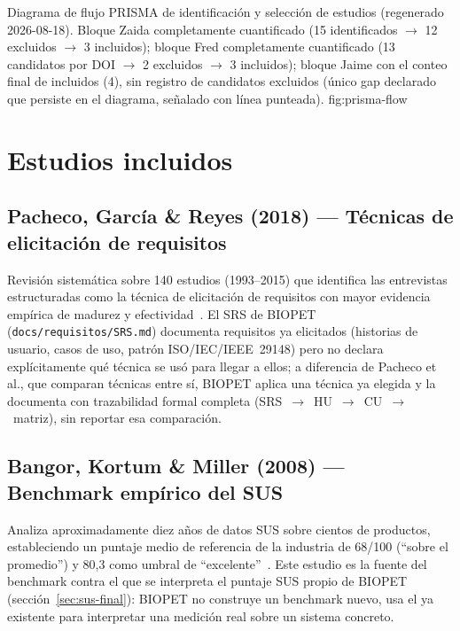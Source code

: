 %
{Diagrama de flujo PRISMA de identificaci\'on y selecci\'on de estudios (regenerado 2026-08-18). Bloque Zaida completamente cuantificado (15 identificados $\to$ 12 excluidos $\to$ 3 incluidos); bloque Fred completamente cuantificado (13 candidatos por DOI $\to$ 2 excluidos $\to$ 3 incluidos); bloque Jaime con el conteo final de incluidos (4), sin registro de candidatos excluidos (\'unico gap declarado que persiste en el diagrama, se\~nalado con l\'inea punteada).}%
{fig:prisma-flow}

\section{Estudios incluidos}

\subsection{Pacheco, Garc\'ia \& Reyes (2018) --- T\'ecnicas de elicitaci\'on de requisitos}
Revisi\'on sistem\'atica sobre 140 estudios (1993--2015) que identifica las
entrevistas estructuradas como la t\'ecnica de elicitaci\'on de requisitos
con mayor evidencia emp\'irica de madurez y efectividad~\cite{pacheco2018requirements}.
El SRS de BIOPET (\texttt{docs/requisitos/SRS.md}) documenta requisitos ya
elicitados (historias de usuario, casos de uso, patr\'on ISO/IEC/IEEE~29148)
pero no declara expl\'icitamente qu\'e t\'ecnica se us\'o para llegar a
ellos; a diferencia de Pacheco et al., que comparan t\'ecnicas entre s\'i,
BIOPET aplica una t\'ecnica ya elegida y la documenta con trazabilidad
formal completa (SRS~$\to$~HU~$\to$~CU~$\to$~matriz), sin reportar esa
comparaci\'on.

\subsection{Bangor, Kortum \& Miller (2008) --- Benchmark emp\'irico del SUS}
Analiza aproximadamente diez a\~nos de datos SUS sobre cientos de
productos, estableciendo un puntaje medio de referencia de la industria de
68/100 (``sobre el promedio'') y 80{,}3 como umbral de
``excelente''~\cite{bangor2008sus}. Este estudio es la fuente del
benchmark contra el que se interpreta el puntaje SUS propio de BIOPET
(secci\'on~\ref{sec:sus-final}): BIOPET no construye un benchmark nuevo,
usa el ya existente para interpretar una medici\'on real sobre un sistema
concreto.

